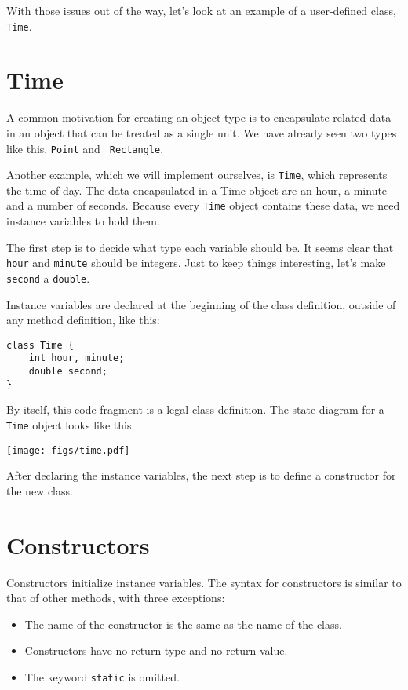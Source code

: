 \documentclass[12pt]{book}
\theoremstyle{definition}
\begin{document}
With those issues out of the way, let's look at an example of
a user-defined class, {\tt Time}.


\section{Time}

A common motivation for creating an object type is to encapsulate
related data in an object that can be treated as a single unit.  We
have already seen two types like this, {\tt Point} and {\tt
Rectangle}.

Another example, which we will implement ourselves, is {\tt Time},
which represents the time of day.  The data encapsulated in a Time
object are an hour, a minute and a number of seconds.  Because every
{\tt Time} object contains these data, we need instance
variables to hold them.

The first step is to decide what type each variable should be.  It
seems clear that {\tt hour} and {\tt minute} should be integers.  Just
to keep things interesting, let's make {\tt second} a {\tt double}.


Instance variables are declared at the beginning of the class
definition, outside of any method definition, like this:

\begin{lstlisting}
class Time {
    int hour, minute;
    double second;
}
\end{lstlisting}
%
By itself, this code fragment is a legal class definition.  The
state diagram for a {\tt Time} object looks like this:


\texttt{[image: figs/time.pdf]}


After declaring the instance variables, the next step is
to define a constructor for the new class.

\section{Constructors}

Constructors initialize instance
variables.  The syntax for constructors is similar to that
of other methods, with three exceptions:

\begin{itemize}

\item The name of the constructor is the same as the name of
the class.

\item Constructors have no return type and no return value.

\item The keyword {\tt static} is omitted.

\end{itemize}
\end{document}
